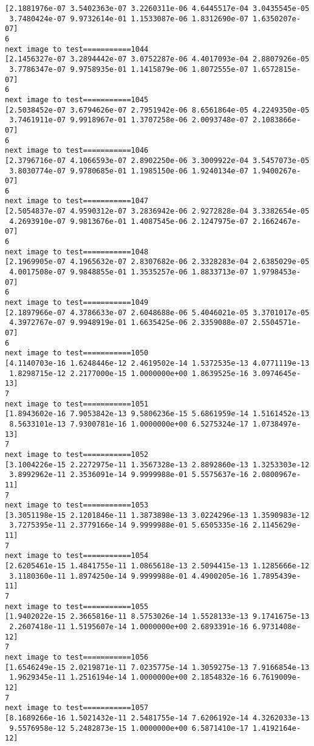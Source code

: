 \documentclass[11pt]{article}
\begin{document}
\begin{Verbatim}[commandchars=\\\{\}]
[2.1881976e-07 3.5402363e-07 3.2260311e-06 4.6445517e-04 3.0435545e-05
 3.7480424e-07 9.9732614e-01 1.1533087e-06 1.8312690e-07 1.6350207e-07]
6
next image to test===========1044
[2.1456327e-07 3.2894442e-07 3.0752287e-06 4.4017093e-04 2.8807926e-05
 3.7786347e-07 9.9758935e-01 1.1415879e-06 1.8072555e-07 1.6572815e-07]
6
next image to test===========1045
[2.5038452e-07 3.6794626e-07 2.7951942e-06 8.6561864e-05 4.2249350e-05
 3.7461911e-07 9.9918967e-01 1.3707258e-06 2.0093748e-07 2.1083866e-07]
6
next image to test===========1046
[2.3796716e-07 4.1066593e-07 2.8902250e-06 3.3009922e-04 3.5457073e-05
 3.8030774e-07 9.9780685e-01 1.1985150e-06 1.9240134e-07 1.9400267e-07]
6
next image to test===========1047
[2.5054837e-07 4.9590312e-07 3.2836942e-06 2.9272828e-04 3.3382654e-05
 4.2693910e-07 9.9813676e-01 1.4087545e-06 2.1247975e-07 2.1662467e-07]
6
next image to test===========1048
[2.1969905e-07 4.1965632e-07 2.8307682e-06 2.3328283e-04 2.6385029e-05
 4.0017508e-07 9.9848855e-01 1.3535257e-06 1.8833713e-07 1.9798453e-07]
6
next image to test===========1049
[2.1897966e-07 4.3786633e-07 2.6048688e-06 5.4046021e-05 3.3701017e-05
 4.3972767e-07 9.9948919e-01 1.6635425e-06 2.3359088e-07 2.5504571e-07]
6
next image to test===========1050
[4.1140703e-16 1.6248446e-12 2.4619502e-14 1.5372535e-13 4.0771119e-13
 1.8298715e-12 2.2177000e-15 1.0000000e+00 1.8639525e-16 3.0974645e-13]
7
next image to test===========1051
[1.8943602e-16 7.9053842e-13 9.5806236e-15 5.6861959e-14 1.5161452e-13
 8.5633101e-13 7.9300781e-16 1.0000000e+00 6.5275324e-17 1.0738497e-13]
7
next image to test===========1052
[3.1004226e-15 2.2272975e-11 1.3567328e-13 2.8892860e-13 1.3253303e-12
 3.8992962e-11 2.3536091e-14 9.9999988e-01 5.5575637e-16 2.0800967e-11]
7
next image to test===========1053
[3.3051198e-15 2.1201846e-11 1.3873898e-13 3.0224296e-13 1.3590983e-12
 3.7275395e-11 2.3779166e-14 9.9999988e-01 5.6505335e-16 2.1145629e-11]
7
next image to test===========1054
[2.6205461e-15 1.4841755e-11 1.0865618e-13 2.5094415e-13 1.1285666e-12
 3.1180360e-11 1.8974250e-14 9.9999988e-01 4.4900205e-16 1.7895439e-11]
7
next image to test===========1055
[1.9402022e-15 2.3665816e-11 8.5753026e-14 1.5528133e-13 9.1741675e-13
 2.2607418e-11 1.5195607e-14 1.0000000e+00 2.6893391e-16 6.9731408e-12]
7
next image to test===========1056
[1.6546249e-15 2.0219871e-11 7.0235775e-14 1.3059275e-13 7.9166854e-13
 1.9629345e-11 1.2516194e-14 1.0000000e+00 2.1854832e-16 6.7619009e-12]
7
next image to test===========1057
[8.1689266e-16 1.5021432e-11 2.5481755e-14 7.6206192e-14 4.3262033e-13
 9.5576958e-12 5.2482873e-15 1.0000000e+00 6.5871410e-17 1.4192164e-12]

\end{Verbatim}
\end{document}
